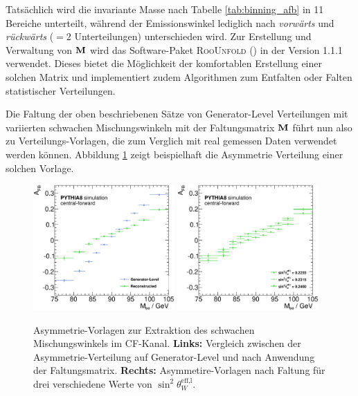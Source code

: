 Tatsächlich wird die invariante Masse nach Tabelle \ref{tab:binning_afb} in 11
Bereiche unterteilt, während der Emissionswinkel lediglich nach
\textit{vorwärts} und \textit{rückwärts} ($=2$ Unterteilungen) unterschieden
wird. Zur Erstellung und Verwaltung von $\bf{M}$ wird das Software-Paket
\textsc{RooUnfold} (\cite{2011arXiv1105.1160A}) in der Version 1.1.1 verwendet.
Dieses bietet die Möglichkeit der komfortablen Erstellung einer solchen Matrix
und implementiert zudem Algorithmen zum Entfalten oder Falten statistischer
Verteilungen.

Die Faltung der oben beschriebenen Sätze von Generator-Level Verteilungen mit
variierten schwachen Mischungswinkeln mit der Faltungsmatrix $\bf{M}$ führt nun
also zu Verteilungs-Vorlagen, die zum Verglich mit real gemessen Daten
verwendet werden können. Abbildung \ref{fig:vorlage} zeigt beispielhaft die
Asymmetrie Verteilung einer solchen Vorlage.

\begin{figure}
    \centering
    \includegraphics[width=0.48\textwidth]{plots/templates_cf_comp}
    \hfill
    \includegraphics[width=0.48\textwidth]{plots/templates_cf}
    \caption[Asymmetrie-Vorlagen zur Extraktion des schwachen Mischungswinkels]
        {Asymmetrie-Vorlagen zur Extraktion des schwachen Mischungswinkels im
        \ac{CF}-Kanal. \textbf{Links:} Vergleich zwischen der
        Asymmetrie-Verteilung auf Generator-Level und nach Anwendung der
        Faltungsmatrix. \textbf{Rechts:} Asymmetire-Vorlagen nach Faltung für
        drei verschiedene Werte von $\sin^2\theta_W^\text{eff,l}$.}
    \label{fig:vorlage}
\end{figure}

